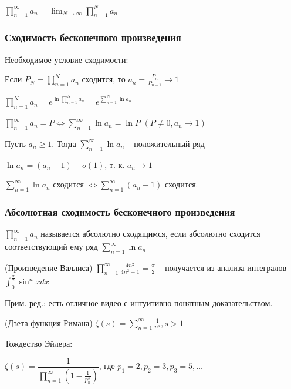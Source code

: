 $\prod_{n=1}^{\infty} a_n = \lim_{N \to \infty} \prod_{n=1}^{N} a_n$

\subsubsection{Сходимость бесконечного произведения}

Необходимое условие сходимости:

Если $P_N = \prod_{n=1}^N a_n$ сходится, то $a_n = \frac{P_n}{P_{n - 1}} \to 1$

$\prod_{n=1}^{N} a_n = e^{\ln \prod_{n=1}^{N} a_n} = e^{\sum_{n=1}^{N} \ln a_n}$

$\prod_{n=1}^{\infty} a_n = P \iff \sum_{n=1}^{\infty} \ln a_n = \ln P$ $(P \neq 0, a_n \to 1)$

Пусть $a_n \geq 1$. Тогда $\sum_{n=1}^{\infty} \ln a_n$ -- положительный ряд

$\ln a_n =  (a_n - 1) + o(1)$, т. к. $a_n \to 1$

$\sum_{n=1}^{\infty} \ln a_n$ сходится $\iff \sum_{n=1}^{\infty} (a_n - 1)$ сходится.

\subsubsection{Абсолютная сходимость бесконечного произведения}

$\prod_{n=1}^{\infty} a_n$ называется абсолютно сходящимся, если абсолютно сходится соответствующий ему ряд $\sum_{n=1}^{\infty} \ln a_n$

\begin{comment}
    $\prod_{n=1}^{\infty} a_n$ сходится абсолютно $\iff \sum_{n=1}^{\infty} (a_n - 1)$ сходится абсолютно.
\end{comment}

\begin{example}
(Произведение Валлиса)
$\prod_{n=1}^{\infty} \frac{4n^2}{4n^2 - 1} = \frac{\pi}{2}$ -- получается из анализа интегралов $\int_{0}^{\frac{\pi}{2}} \sin^n x dx$

Прим. ред.: есть отличное \href{https://www.youtube.com/watch?v=8GPy_UMV-08}{видео} с интуитивно понятным доказательством.
\end{example}

\begin{example}
    (Дзета-функция Римана) $\zeta(s) = \sum_{n=1}^{\infty} \frac{1}{n^s}, s > 1$

    Тождество Эйлера:

    $\zeta(s) = \dfrac{1}{\prod_{n=1}^{\infty}(1 - \frac{1}{p_n^s})}$, где $p_1 = 2, p_2 = 3, p_3 = 5, \dots$
\end{example}

